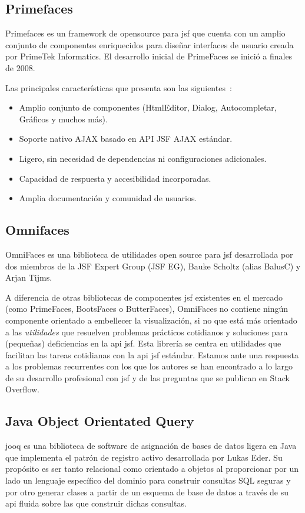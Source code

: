 \subsection{Primefaces}
\label{sec:primefaces}

Primefaces es un framework de \gls{opensource} para \acrshort{jsf} que cuenta con un amplio conjunto de componentes enriquecidos para diseñar interfaces de usuario creada por PrimeTek Informatics. El desarrollo inicial de PrimeFaces se inició a finales de 2008.

Las principales características que presenta son las siguientes~\cite{Primefaces}:
\begin{itemize}
\item Amplio conjunto de componentes (HtmlEditor, Dialog, Autocompletar, Gráficos y muchos más).
\item Soporte nativo AJAX basado en API JSF AJAX estándar. 
\item Ligero, sin necesidad de dependencias ni configuraciones adicionales. 
\item Capacidad de respuesta y accesibilidad incorporadas. 
\item Amplia documentación y comunidad de usuarios.
\end{itemize}


\subsection{Omnifaces}
\label{sec:omnifaces}

OmniFaces es una biblioteca de utilidades open source para \acrshort{jsf} desarrollada por dos miembros de la JSF Expert Group (JSF EG), Bauke Scholtz (alias BalusC) y Arjan Tijms.

A diferencia de otras bibliotecas de componentes \acrshort{jsf}  existentes en el mercado (como PrimeFaces, BootsFaces o ButterFaces), OmniFaces no contiene ningún componente orientado a embellecer la visualización, si no que está más orientado a las \textit{utilidades} que resuelven problemas prácticos cotidianos y soluciones para (pequeñas) deficiencias en la \acrshort{api}  \acrshort{jsf}. Esta librería se centra en utilidades que facilitan las tareas cotidianas con la \acrshort{api} \acrshort{jsf} estándar. Estamos ante una respuesta a los problemas recurrentes con los que los autores se han encontrado a lo largo de su desarrollo profesional con \acrshort{jsf} y de las preguntas que se publican en Stack Overflow.

\subsection{Java Object Orientated Query}
\label{sec:jooq}
\acrfull{jooq} es una biblioteca de software de asignación de bases de datos ligera en Java que implementa el patrón de registro activo desarrollada por Lukas Eder. Su propósito es ser tanto relacional como orientado a objetos al proporcionar por un lado un lenguaje específico del dominio para construir consultas SQL seguras y por otro generar clases a partir de un esquema de base de datos a través de su \acrshort{api} fluida sobre las que construir dichas consultas.

